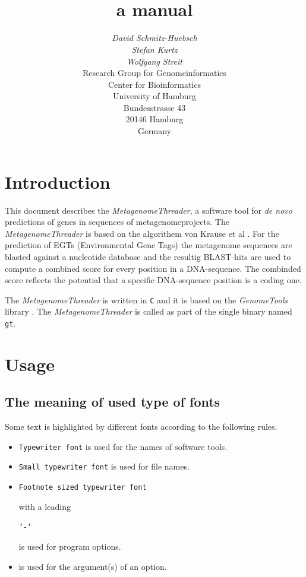 \documentclass[12pt,titlepage]{article}
\title{\MetagenomeThreader\\
a manual}
\author{\begin{tabular}{c}
         \textit{David Schmitz-Huebsch}\\
         \textit{Stefan Kurtz}\\
         \textit{Wolfgang Streit}\\[1cm]
         Research Group for Genomeinformatics\\
         Center for Bioinformatics\\
         University of Hamburg\\
         Bundesstrasse 43\\
         20146 Hamburg\\
         Germany\\[1cm]
        \end{tabular}}
\newcommand{\MetagenomeThreader}{\textit{MetagenomeThreader}\xspace}
\newcommand{\GenomeTools}{\textit{GenomeTools}\xspace}
\newcommand{\Gt}{\texttt{gt}\xspace}
\begin{document}
\maketitle

\section{Introduction} \label{Introduction}

This document describes the \MetagenomeThreader, a software tool
for \textit{de novo} predictions of genes in sequences of metagenomeprojects.
The \MetagenomeThreader is based on the algorithem von Krause et al \cite{krause}.
For the prediction of EGTs (Environmental Gene Tags) the metagenome sequences are
blasted against a nucleotide database and the resultig BLAST-hits are used to
compute a combined score for every position in a DNA-sequence. The combinded score
reflects the potential that a specific DNA-sequence position is a coding one.

The \MetagenomeThreader is written in \texttt{C} and it is based 
on the \GenomeTools library \cite{genometools}. The \MetagenomeThreader is called
as part of the single binary named \Gt.

\section{Usage} \label{Usage}

\subsection{The meaning of used type of fonts} \label{Fonts}
Some text is highlighted by different fonts according to the following rules.

\begin{itemize}
\item \texttt{Typewriter font} is used for the names of software tools.
\item \texttt{\small{Small typewriter font}} is used for file names.
\item \begin{footnotesize}\texttt{Footnote sized typewriter font}
      \end{footnotesize} with a leading 
      \begin{footnotesize}\texttt{'-'}\end{footnotesize} 
      is used for program options.
\item {} is used for the argument(s) of an
      option.
\end{itemize}
\end{document}
